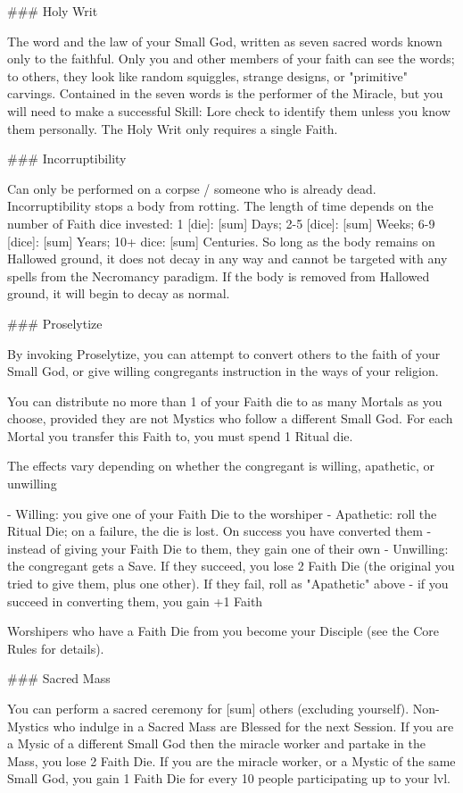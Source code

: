 ### Holy Writ

The word and the law of your Small God, written as seven sacred words known only to the faithful.  Only you and other members of your faith can see the words; to others, they look like random squiggles, strange designs, or "primitive" carvings.  Contained in the seven words is the performer of the Miracle, but you will need to make a successful Skill: Lore check to identify them unless you know them personally.   The Holy Writ only requires a single Faith.



### Incorruptibility

Can only be performed on a corpse / someone who is already dead.  Incorruptibility stops a body from rotting.  The length of time depends on the number of Faith dice invested:  1 [die]: [sum] Days; 2-5 [dice]: [sum] Weeks; 6-9 [dice]: [sum] Years; 10+ dice: [sum] Centuries.  So long as the body remains on Hallowed ground, it does not decay in any way and cannot be targeted with any spells from the Necromancy paradigm.  If the body is removed from Hallowed ground, it will begin to decay as normal.

### Proselytize

By invoking Proselytize, you can attempt to convert others to the faith of your Small God, or give willing congregants instruction in the ways of your religion.  

You can distribute no more than 1 of your Faith die to as many Mortals as you choose, provided they are not Mystics who follow a different Small God.  For each Mortal you transfer this Faith to, you must spend 1 Ritual die.

The effects vary depending on whether the congregant is willing, apathetic, or unwilling

- Willing:  you give one of your Faith Die to the worshiper
- Apathetic:  roll the Ritual Die; on a failure, the die is lost.  On success you have converted them - instead of giving your Faith Die to them, they gain one of their own
- Unwilling:  the congregant gets a Save.  If they succeed, you lose 2 Faith Die (the original you tried to give them, plus one other).  If they fail, roll as "Apathetic" above - if you succeed in converting them, you gain +1 Faith

Worshipers who have a Faith Die from you become your Disciple (see the Core Rules for details).

### Sacred Mass

You can perform a sacred ceremony for [sum] others (excluding yourself).  Non-Mystics who indulge in a Sacred Mass are Blessed for the next Session.  If you are a Mysic of a different Small God then the miracle worker and partake in the Mass, you lose 2 Faith Die.  If you are the miracle worker, or a Mystic of the same Small God, you gain 1 Faith Die for every 10 people participating up to your {lvl}.




